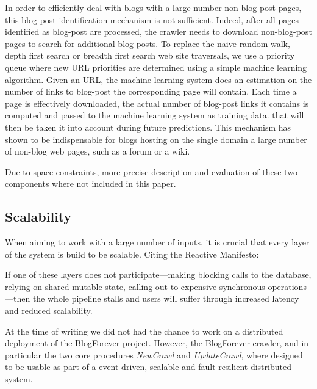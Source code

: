 In order to efficiently deal with blogs with a large number non-blog-post pages, this blog-post identification mechanism is not sufficient. Indeed, after all pages identified as blog-post are processed, the crawler needs to download non-blog-post pages to search for additional blog-posts. To replace the naive random walk, depth first search or breadth first search web site traversals, we use a priority queue where new URL priorities are determined using a simple machine learning algorithm. Given an URL, the machine learning system does an estimation on the number of links to blog-post the corresponding page will contain. Each time a page is effectively downloaded, the actual number of blog-post links it contains is computed and passed to the machine learning system as training data. that will then be taken it into account during future predictions. This mechanism has shown to be indispensable for blogs hosting on the single domain a large number of non-blog web pages, such as a forum or a wiki.

Due to space constraints, more precise description and evaluation of these two components where not included in this paper.


\subsection{Scalability}
When aiming to work with a large number of inputs, it is crucial that every layer of the system is build to be scalable. Citing the Reactive Manifesto\cite{thereactivemanifesto2013}:

\begin{quoting}
  If one of these layers does not participate—making blocking calls to the database, relying on shared mutable state, calling out to expensive synchronous operations—then the whole pipeline stalls and users will suffer through increased latency and reduced scalability.
\end{quoting}

At the time of writing we did not had the chance to work on a distributed deployment of the BlogForever project. However, the BlogForever crawler, and in particular the two core procedures \emph{NewCrawl} and \emph{UpdateCrawl}, where designed to be usable as part of a event-driven, scalable and fault resilient distributed system.


